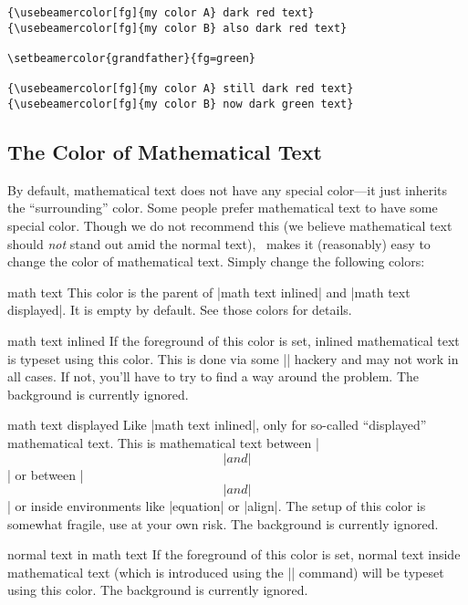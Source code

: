 \begin{command}{\setbeamercolor\opt{|*|}}
\begin{itemize}
\begin{verbatim}
{\usebeamercolor[fg]{my color A} dark red text}
{\usebeamercolor[fg]{my color B} also dark red text}

\setbeamercolor{grandfather}{fg=green}

{\usebeamercolor[fg]{my color A} still dark red text}
{\usebeamercolor[fg]{my color B} now dark green text}
\end{verbatim}
  \end{itemize}
\end{command}


\subsection{The Color of Mathematical Text}

By default, mathematical text does not have any special color---it just inherits the ``surrounding'' color. Some people prefer mathematical text to have some special color. Though we do not recommend this (we believe mathematical text should \emph{not} stand out amid the normal text), \beamer\ makes it (reasonably) easy to change the color of mathematical text. Simply change the following colors:

\begin{element}{math text}\no\yes\no
  This color is the parent of |math text inlined| and |math text displayed|. It is empty by default. See those colors for details.
\end{element}

\begin{element}{math text inlined}\no\yes\no
  If the foreground of this color is set, inlined mathematical text is typeset using this color. This is done via some |\everymath| hackery and may not work in all cases. If not, you'll have to try to find a way around the problem. The background is currently ignored.
\end{element}

\begin{element}{math text displayed}\no\yes\no
  Like |math text inlined|, only for so-called ``displayed'' mathematical text. This is mathematical text between |\[| and |\]| or between |$$| and |$$| or inside environments like |equation| or |align|. The setup of this color is somewhat fragile, use at your own risk. The background is currently ignored.
\end{element}

\begin{element}{normal text in math text}\no\yes\no
  If the foreground of this color is set, normal text inside mathematical text (which is introduced using the |\text| command) will be typeset using this color. The background is currently ignored.
\end{element}


